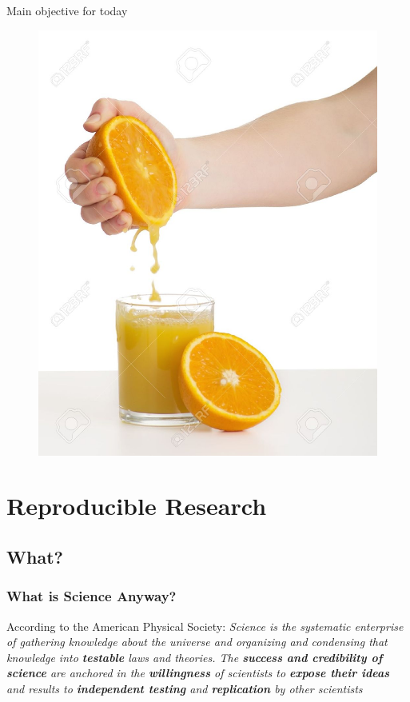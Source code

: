 \documentclass[10pt]{beamer}\usepackage[]{graphicx}\usepackage[]{color}
\begin{document}
\begin{frame}{Main objective for today}
\begin{figure}[h!]
\centering
\includegraphics[scale=0.60, keepaspectratio]{./juice}
\end{figure}
\end{frame}



\section{Reproducible Research}

\subsection{What?}

\begin{frame}

\frametitle{What is Science Anyway?}

\pause
\begin{block}{According to the American Physical Society:}
\emph{Science is the systematic enterprise of gathering knowledge about the universe and organizing and condensing that knowledge into \textbf{testable} laws and theories. The \textbf{success and credibility of science} are anchored in the \textbf{willingness} of scientists to \textbf{expose their ideas} and results to \textbf{independent testing} and \textbf{replication} by other scientists}
\end{block}

\end{frame}
\end{document}
